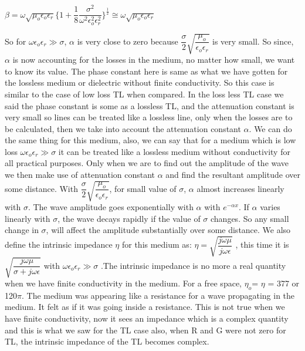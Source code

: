 \begin{center}
	$\beta = \omega\sqrt{\mu_{o}\epsilon_{o}\epsilon_{r}}\Bigg\{1 + \dfrac{1}{8} \dfrac{\sigma^{2}}{\omega^{2}\epsilon_{o}^{2}\epsilon_{r}^{2}}\Bigg\}^{\frac{1}{2}} \cong \omega\sqrt{\mu_{o}\epsilon_{o}\epsilon_{r}}$
\end{center}

So for $\omega\epsilon_{o}\epsilon_{r} \gg \sigma$, $\alpha$ is very close to zero because $\dfrac{\sigma}{2}\sqrt{\dfrac{\mu_{o}}{\epsilon_{o}\epsilon_{r}}}$ is very small. So since, $\alpha$ is now accounting for the losses in the medium, no matter how small, we want to know its value. The phase constant here is same as what we have gotten for the lossless medium or dielectric without finite conductivity. So this case is similar to the case of low loss TL when compared.
In the loss less TL case we said the phase constant is some as a lossless TL, and the attenuation constant is very small so lines can be treated like a lossless line, only when the losses are to be calculated, then we take into account the attenuation constant $\alpha$. We can do the same thing for this medium, also, we can say that for a medium which is low loss $\omega\epsilon_{o}\epsilon_{r} \gg \sigma$ it can be treated like a lossless medium without conductivity for all practical purposes. Only when we are to find out the amplitude of the wave we then make use of attenuation constant $\alpha$ and find the resultant amplitude over some distance. With $\dfrac{\sigma}{2}\sqrt{\dfrac{\mu_{o}}{\epsilon_{o}\epsilon_{r}}}$, for small value of $\sigma$, $\alpha$ almost increases linearly with $\sigma$. The wave amplitude goes exponentially with $\alpha$ with $e^{-\alpha x}$. If $\alpha$ varies linearly with $\sigma$, the wave decays rapidly if the value of $\sigma$ changes. So any small change in $\sigma$, will affect the amplitude substantially over some distance. 
We also define the intrinsic impedance $\eta$ for this medium as:
$\eta= \sqrt{\dfrac{j\omega\mu}{j\omega\epsilon}}$ , this time it is $\sqrt{\dfrac{j\omega\mu}{\sigma + j\omega\epsilon}}$ with $\omega\epsilon_{o}\epsilon_{r} \gg \sigma$ .The intrinsic impedance is no more a real quantity when we have finite conductivity in the medium. For a free space, $\eta_{o}$= $\eta$ = 377 or 120$\pi$. The medium was appearing like a resistance for a wave propagating in the medium. It felt as if it was going inside a resistance. This is not true when we have finite conductivity, now it sees an impedance which is a complex quantity and this is what we saw for the TL case also, when R and G were not zero for TL, the intrinsic impedance of the TL becomes complex.